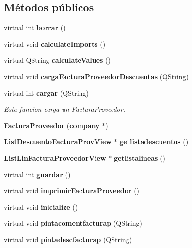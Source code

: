 \subsection*{M\'{e}todos p\'{u}blicos}
\begin{CompactItemize}
\item 
virtual int {\bf borrar} ()\label{classFacturaProveedor_a0}

\item 
virtual void {\bf calculate\-Imports} ()\label{classFacturaProveedor_a1}

\item 
virtual QString {\bf calculate\-Values} ()\label{classFacturaProveedor_a2}

\item 
virtual void {\bf carga\-Factura\-Proveedor\-Descuentas} (QString)\label{classFacturaProveedor_a3}

\item 
virtual int {\bf cargar} (QString)\label{classFacturaProveedor_a4}

\begin{CompactList}\small\item\em Esta funcion carga un Factura\-Proveedor. \item\end{CompactList}\item 
{\bf Factura\-Proveedor} ({\bf company} $\ast$)\label{classFacturaProveedor_a5}

\item 
{\bf List\-Descuento\-Factura\-Prov\-View} $\ast$ {\bf getlistadescuentos} ()\label{classFacturaProveedor_a6}

\item 
{\bf List\-Lin\-Factura\-Proveedor\-View} $\ast$ {\bf getlistalineas} ()\label{classFacturaProveedor_a7}

\item 
virtual int {\bf guardar} ()\label{classFacturaProveedor_a8}

\item 
virtual void {\bf imprimir\-Factura\-Proveedor} ()
\item 
virtual void {\bf inicialize} ()\label{classFacturaProveedor_a10}

\item 
virtual void {\bf pintacomentfacturap} (QString)\label{classFacturaProveedor_a11}

\item 
virtual void {\bf pintadescfacturap} (QString)\label{classFacturaProveedor_a12}


\end{CompactItemize}
